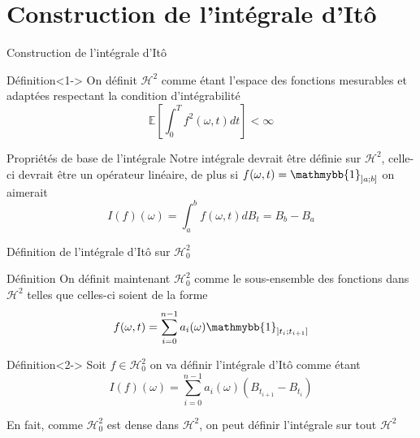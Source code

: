 \documentclass{beamer}
\newcommand{\1}{\mathmybb{1}}
\begin{document}
 \section{Construction de l'intégrale d'Itô}
 \begin{frame}{Construction de l'intégrale d'Itô}
   \begin{block}{Définition}<1->
     On définit $\mathcal{H}^{2}$ comme étant l'espace des fonctions mesurables et adaptées respectant la condition d'intégrabilité \\
     \[
       \mathbb{E}\left[\int_{0}^{T}f^{2}(\omega, t) dt \right] < \infty
     \]
   \end{block}
   \begin{block}{Propriétés de base de l'intégrale}
     Notre intégrale devrait être définie sur $\mathcal{H}^{2}$, celle-ci devrait être un opérateur linéaire, de plus
si $ f(\omega, t) = \1_{\left] a; b \right]} $ on aimerait
     \[
       I(f)(\omega) = \int_{a}^{b}f(\omega, t) dB_{t} = B_{b} - B_{a}
     \]
   \end{block}
 \end{frame}
 
 \begin{frame}{Définition de l'intégrale d'Itô sur $\mathcal{H}^2_0$}
      \begin{block}{Définition}
     On définit maintenant $\mathcal{H}^{2}_{0}$ comme le sous-ensemble des fonctions dans $\mathcal{H}^{2}$ telles que celles-ci soient de la forme 
     \[
       f(\omega, t) = \sum_{i=0}^{n-1}a_{i}(\omega) \1_{\left] t_{i} ; t_{i+1} \right] }
     \]
     \end{block}
     \begin{block}{Définition}<2->
       Soit $ f \in \mathcal{H}^{2}_{0} $ on va définir l'intégrale d'Itô comme étant
       \[
         I(f)(\omega) = \sum_{i=0}^{n-1} a_{i}(\omega)\left( B_{t_{i+1}} - B_{t_{i}} \right)
       \]
     \end{block}
     \pause
   En fait, comme $ \mathcal{H}^{2}_{0}$ est dense dans $\mathcal{H}^{2}$, on peut définir l'intégrale sur tout $\mathcal{H}^2$
 \end{frame}
\end{document}
